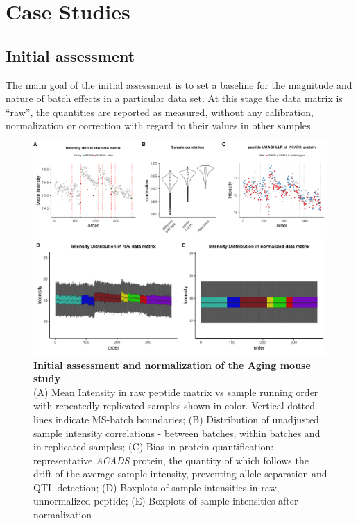 \documentclass[num-refs]{wiley-article}
\begin{document}
\section{Case Studies}\label{subsec:case_studies}
\subsection{Initial assessment}
The main goal of the initial assessment is to set a baseline for the magnitude and nature of batch effects in a particular data set. At this stage the data matrix is “raw”, the quantities are reported as measured, without any calibration, normalization or correction with regard to their values in other samples.


\begin{figure}[hbt]
	\includegraphics[width=\textwidth]{figures/Fig2_initial_assessment_v1.pdf}
	
	\caption{\textbf{Initial assessment and normalization of the Aging mouse study} \\
		\footnotesize
		(A) Mean Intensity in raw peptide matrix vs sample running order with repeatedly replicated samples shown in color. Vertical dotted lines indicate MS-batch boundaries; (B) Distribution of unadjusted sample intensity correlations - between batches, within batches and in replicated samples; (C) Bias in protein quantification: representative \textit{ACADS} protein, the quantity of which follows the drift of the average sample intensity, preventing allele separation and QTL detection; (D) Boxplots of sample intensities in raw, unnormalized peptide; (E) Boxplots of sample intensities after normalization}
	\label{fig:batch_fig2_initAssessment}
\end{figure}
\end{document}
